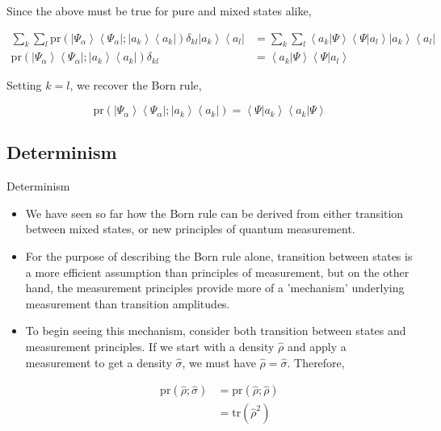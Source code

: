 \documentclass[9pt,handout]{beamer}
\newcommand{\pr}[0]{\text{pr}}
\newcommand{\tr}[0]{\text{tr}}
\begin{document}
\begin{frame}{}
Since the above must be true for pure and mixed states alike,

\begin{align*}
\sum_k \sum_l \pr \left( \left\lvert \Psi_\alpha \right\rangle \left\langle \Psi_\alpha \right\rvert; \left\lvert a_k \right\rangle \left\langle a_k \right\rvert \right) \delta_{k l} \left\lvert a_k \right\rangle \left\langle a_l \right\rvert & = \sum_k \sum_l \left\langle a_k \right\rvert \left. \Psi \right\rangle \left\langle \Psi \right\rvert \left. a_l \right\rangle \left\lvert a_k \right\rangle \left\langle a_l \right\rvert \\
\pr \left( \left\lvert \Psi_\alpha \right\rangle \left\langle \Psi_\alpha \right\rvert; \left\lvert a_k \right\rangle \left\langle a_k \right\rvert \right) \delta_{k l} & = \left\langle a_k \right\rvert \left. \Psi \right\rangle \left\langle \Psi \right\rvert \left. a_l \right\rangle
\end{align*}

Setting $k = l$, we recover the Born rule,

$$\pr \left( \left\lvert \Psi_\alpha \right\rangle \left\langle \Psi_\alpha \right\rvert; \left\lvert a_k \right\rangle \left\langle a_k \right\rvert \right) = \left\langle \Psi \right\rvert \left. a_k \right\rangle \left\langle a_k \right\rvert \left. \Psi \right\rangle$$
\end{frame}

\subsection{Determinism}
\begin{frame}{Determinism}
\begin{itemize}
\item We have seen so far how the Born rule can be derived from either transition between mixed states, or new principles of quantum measurement.

\item For the purpose of describing the Born rule alone, transition between states is a more efficient assumption than principles of measurement, but on the other hand, the measurement principles provide more of a 'mechanism' underlying measurement than transition amplitudes.

\item To begin seeing this mechanism, consider both transition between states and measurement principles. If we start with a density $\widehat{\rho}$ and apply a measurement to get a density $\widehat{\sigma}$, we must have $\widehat{\rho} = \widehat{\sigma}$. Therefore,

\begin{align*}
\pr \left( \widehat{\rho}; \widehat{\sigma} \right) & = \pr \left( \widehat{\rho}; \widehat{\rho} \right) \\
& = \tr \left( \widehat{\rho}^2 \right) 
\end{align*}
\end{itemize}
\end{frame}
\end{document}
